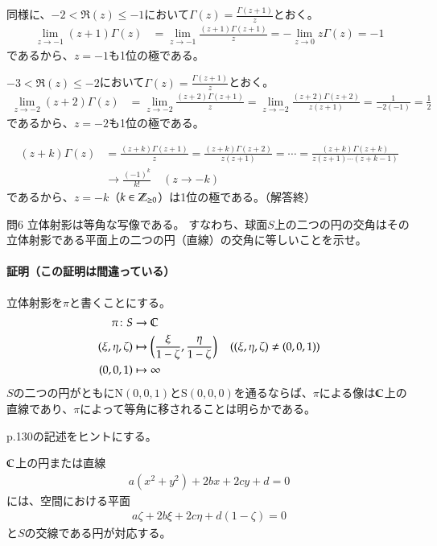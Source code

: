 同様に、$-2<\Re(z)\le-1$において$\Gamma(z)=\frac{\Gamma(z+1)}{z}$とおく。
\begin{align*}
    \lim_{z\longrightarrow-1}(z+1)\Gamma(z)
    &=\lim_{z\longrightarrow-1}\frac{(z+1)\Gamma(z+1)}{z}
    =-\lim_{z\longrightarrow0}z\Gamma(z)=-1
\end{align*}
であるから、$z=-1$も1位の極である。

$-3<\Re(z)\le-2$において$\Gamma(z)=\frac{\Gamma(z+1)}{z}$とおく。
\begin{align*}
    \lim_{z\longrightarrow-2}(z+2)\Gamma(z)
    &=\lim_{z\longrightarrow-2}\frac{(z+2)\Gamma(z+1)}{z}
    =\lim_{z\longrightarrow-2}\frac{(z+2)\Gamma(z+2)}{z(z+1)}=\frac{1}{-2(-1)}=\frac{1}{2}
\end{align*}
であるから、$z=-2$も1位の極である。

\begin{align*}
    (z+k)\Gamma(z)
    &=\frac{(z+k)\Gamma(z+1)}{z}
    =\frac{(z+k)\Gamma(z+2)}{z(z+1)}
    =\cdots=\frac{(z+k)\Gamma(z+k)}{z(z+1)\cdots(z+k-1)}\\
    &\longrightarrow \frac{(-1)^k}{k!}\quad(z\longrightarrow-k)
\end{align*}
であるから、$z=-k$（$k\in\mathbb{Z}_{\ge0}$）は1位の極である。（解答終）

\begin{mysimplebox}{問6}
    立体射影は等角な写像である。
    すなわち、球面$S$上の二つの円の交角はその立体射影である平面上の二つの円（直線）の交角に等しいことを示せ。
\end{mysimplebox}
\paragraph{証明（この証明は間違っている）}
立体射影を$\pi$と書くことにする。
\begin{align*}
    \pi\colon S &\to \mathbb{C}\\
    (\xi,\eta,\zeta) &\mapsto \left(\frac{\xi}{1-\zeta},\frac{\eta}{1-\zeta}\right)\quad((\xi,\eta,\zeta)\neq(0,0,1))\\
    (0,0,1)&\mapsto\infty
\end{align*}
$S$の二つの円がともにN$(0,0,1)$とS$(0,0,0)$を通るならば、$\pi$による像は$\mathbb{C}$上の直線であり、$\pi$によって等角に移されることは明らかである。

p.130の記述をヒントにする。

$\mathbb{C}$上の円または直線
\begin{align}
    a(x^2+y^2)+2bx+2cy+d=0 \label{eq:6en}
\end{align}
には、空間における平面
\begin{align}
    a\zeta+2b\xi+2c\eta+d(1-\zeta)=0 \label{eq:6S}
\end{align}
と$S$の交線である円が対応する。

